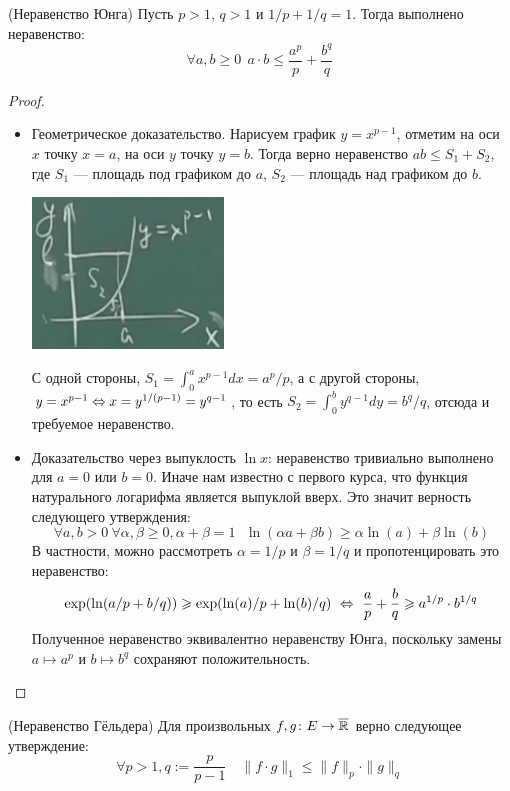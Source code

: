 \begin{proposition} (Неравенство Юнга)
	Пусть $p > 1$, $q > 1$ и $1 / p + 1 / q = 1$. Тогда выполнено неравенство:
	\[
		\forall a, b \ge 0\ \ a \cdot b \le \frac{a^p}{p} + \frac{b^q}{q}
	\]
\end{proposition}

\begin{proof}~
	\begin{itemize}
		\item Геометрическое доказательство. Нарисуем график $y = x^{p - 1}$, отметим на оси $x$ точку $x = a$, на оси $y$ точку $y = b$. Тогда верно неравенство \(ab \le S_1 + S_2\), где $S_1$ --- площадь под графиком до $a$, $S_2$ --- площадь над графиком до $b$.
		\begin{center}
			\includegraphics[width=0.4\textwidth]{images/young_inequation.png}
		\end{center}
		С одной стороны, $S_1 = \int_0^a x^{p - 1}dx = a^p / p$, а с другой стороны, $y = x^{p-1} \Leftrightarrow x = y^{1 / (p - 1)} = y^{q - 1}$, то есть $S_2 = \int_0^b y^{q - 1}dy = b^q/q$, отсюда и требуемое неравенство.
		
		\item Доказательство через выпуклость $\ln x$: неравенство тривиально выполнено для $a = 0$ или $b = 0$. Иначе нам известно с первого курса, что функция натурального логарифма является выпуклой вверх. Это значит верность следующего утверждения:
		\[
			\forall a, b > 0\ \forall \alpha, \beta \ge 0, \alpha + \beta = 1\ \ \ \ln(\alpha a + \beta b) \ge \alpha\ln(a) + \beta\ln(b)
		\]
		В частности, можно рассмотреть $\alpha = 1 / p$ и $\beta = 1 / q$ и пропотенцировать это неравенство:
		\[
			\exp(\ln(a / p + b / q)) \geqslant \exp(\ln(a) / p + \ln(b) / q) \ \Leftrightarrow \ \frac{a}{p} + \frac{b}{q} \geqslant a^{1/p} \cdot b^{1/q}
		\]
		Полученное неравенство эквивалентно неравенству Юнга, поскольку замены $a \mapsto a^p$ и $b \mapsto b^q$ сохраняют положительность.
	\end{itemize}
\end{proof}

\begin{theorem} (Неравенство Гёльдера)
	Для произвольных $f, g \colon E \to \overline{\mathbb{R}}$ верно следующее утверждение:
	\[
		\forall p > 1, q := \frac{p}{p - 1} \quad \|f \cdot g\|_1 \le \|f\|_p \cdot \|g\|_q
	\]
\end{theorem}


